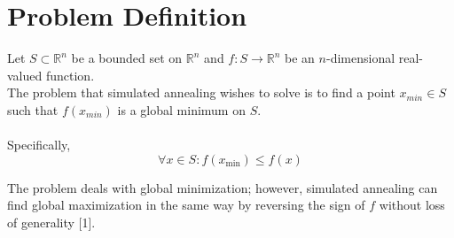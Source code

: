 \section{Problem Definition}
\label{sec:prob}

Let $S\subset\mathbb{R}^n$ be a bounded set on $\mathbb{R}^n$ and $f:S\to\mathbb{R}^n$ be an $n$-dimensional real-valued function. \\
The problem that simulated annealing wishes to solve is to find a point $x_{min} \in S$ such that $f(x_{min})$ is a global minimum on $S$. \\
\\
Specifically, 
\begin{equation}
    \forall x \in S : f(x_{\min}) \leq f(x)
    \label{eq:min-def}
\end{equation}

The problem deals with global minimization; however, simulated annealing can find global maximization in the same way by reversing the sign of $f$ without loss of generality [1].
